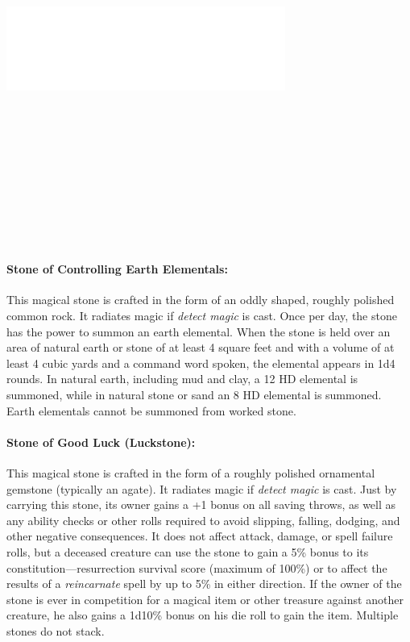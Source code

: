 \begin{multicols}{2}
\noindent\includegraphics[width=3.6in, height=5in]{testblock.pdf}

\paragraph{Stone of Controlling Earth Elementals:} This magical stone is crafted in the form of an oddly shaped, roughly polished common rock.  It radiates magic if \textit{detect magic} is cast.  Once per day, the stone has the power to summon an earth elemental.  When the stone is held over an area of natural earth or stone of at least 4 square feet and with a volume of at least 4 cubic yards and a command word spoken, the elemental appears in 1d4 rounds.  In natural earth, including mud and clay, a 12 HD elemental is summoned, while in natural stone or sand an 8 HD elemental is summoned.  Earth elementals cannot be summoned from worked stone. 

\paragraph{Stone of Good Luck (Luckstone):} This magical stone is crafted in the form of a roughly polished ornamental gemstone (typically an agate).  It radiates magic if \textit{detect magic} is cast.  Just by carrying this stone, its owner gains a +1 bonus on all saving throws, as well as any ability checks or other rolls required to avoid slipping, falling, dodging, and other negative consequences.  It does not affect attack, damage, or spell failure rolls, but a deceased creature can use the stone to gain a 5\% bonus to its constitution---resurrection survival score (maximum of 100\%) or to affect the results of a \textit{reincarnate} spell by up to 5\% in either direction.  If the owner of the stone is ever in competition for a magical item or other treasure against another creature, he also gains a 1d10\% bonus on his die roll to gain the item.  Multiple stones do not stack.


\end{multicols}
